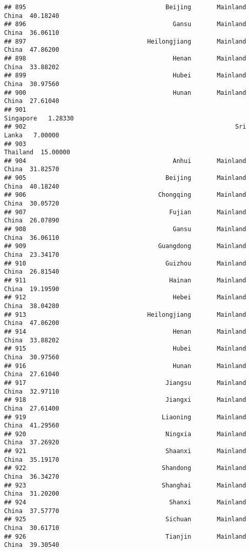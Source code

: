 \documentclass[
]{article}
\begin{document}
\begin{verbatim}
## 895                                      Beijing       Mainland China  40.18240
## 896                                        Gansu       Mainland China  36.06110
## 897                                 Heilongjiang       Mainland China  47.86200
## 898                                        Henan       Mainland China  33.88202
## 899                                        Hubei       Mainland China  30.97560
## 900                                        Hunan       Mainland China  27.61040
## 901                                                         Singapore   1.28330
## 902                                                         Sri Lanka   7.00000
## 903                                                          Thailand  15.00000
## 904                                        Anhui       Mainland China  31.82570
## 905                                      Beijing       Mainland China  40.18240
## 906                                    Chongqing       Mainland China  30.05720
## 907                                       Fujian       Mainland China  26.07890
## 908                                        Gansu       Mainland China  36.06110
## 909                                    Guangdong       Mainland China  23.34170
## 910                                      Guizhou       Mainland China  26.81540
## 911                                       Hainan       Mainland China  19.19590
## 912                                        Hebei       Mainland China  38.04280
## 913                                 Heilongjiang       Mainland China  47.86200
## 914                                        Henan       Mainland China  33.88202
## 915                                        Hubei       Mainland China  30.97560
## 916                                        Hunan       Mainland China  27.61040
## 917                                      Jiangsu       Mainland China  32.97110
## 918                                      Jiangxi       Mainland China  27.61400
## 919                                     Liaoning       Mainland China  41.29560
## 920                                      Ningxia       Mainland China  37.26920
## 921                                      Shaanxi       Mainland China  35.19170
## 922                                     Shandong       Mainland China  36.34270
## 923                                     Shanghai       Mainland China  31.20200
## 924                                       Shanxi       Mainland China  37.57770
## 925                                      Sichuan       Mainland China  30.61710
## 926                                      Tianjin       Mainland China  39.30540

\end{verbatim}
\end{document}
